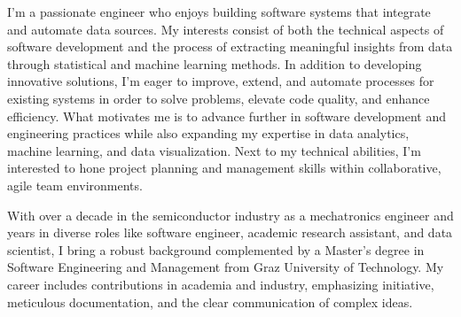 \documentclass[a4paper]{./src/resume-cv}
\begin{document}
\lastupdated


\vfill
\begin{minipage}[t]{\textwidth}
    \begin{onecolumncventry}[1]
        I’m a passionate engineer who enjoys building software systems that integrate and automate data sources. My interests consist of both the technical aspects of software development and the process of extracting meaningful insights from data through statistical and machine learning methods. In addition to developing innovative solutions, I’m eager to improve, extend, and automate processes for existing systems in order to solve problems, elevate code quality, and enhance efficiency. What motivates me is to advance further in software development and engineering practices while also expanding my expertise in data analytics, machine learning, and data visualization. Next to my technical abilities, I’m interested to hone project planning and management skills within collaborative, agile team environments.
        \subsectionsep

        With over a decade in the semiconductor industry as a mechatronics engineer and years in diverse roles like software engineer, academic research assistant, and data scientist, I bring a robust background complemented by a Master’s degree in Software Engineering and Management from Graz University of Technology. My career includes contributions in academia and industry, emphasizing initiative, meticulous documentation, and the clear communication of complex ideas.

   

\end{onecolumncventry}
\end{minipage}
\end{document}
